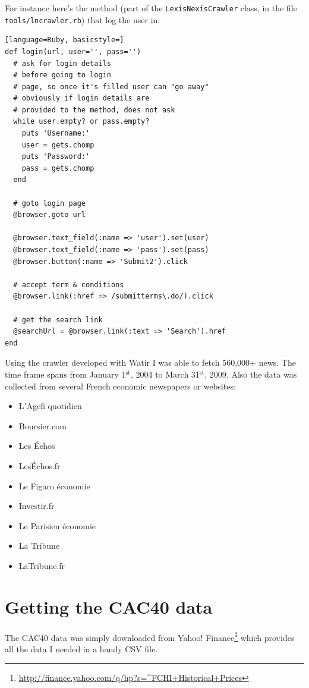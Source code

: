 \documentclass[12pt]{report}
\newcommand{\superscript}[1]{\ensuremath{^{\textrm{#1}}}}
\newcommand{\st}[0]{\superscript{st}}
\begin{document}
			For instance here's the method (part of the \lstinline!LexisNexisCrawler! class, in the file \lstinline!tools/lncrawler.rb!) that log the user in:
			
			\begin{lstlisting}[language=Ruby, basicstyle=]
def login(url, user='', pass='')
  # ask for login details
  # before going to login
  # page, so once it's filled user can "go away"
  # obviously if login details are 
  # provided to the method, does not ask
  while user.empty? or pass.empty?
    puts 'Username:'
    user = gets.chomp
    puts 'Password:'
    pass = gets.chomp
  end

  # goto login page
  @browser.goto url

  @browser.text_field(:name => 'user').set(user)
  @browser.text_field(:name => 'pass').set(pass)
  @browser.button(:name => 'Submit2').click
                                                                                                 
  # accept term & conditions
  @browser.link(:href => /submitterms\.do/).click

  # get the search link
  @searchUrl = @browser.link(:text => 'Search').href
end
			\end{lstlisting}
			
			Using the crawler developed with Watir I was able to fetch 560,000+ news. The time frame spans from January 1\st, 2004 to March 31\st, 2009. Also the data was collected from several French economic newspapers or websites:
			\begin{itemize}
				\item L'Agefi quotidien
				\item Boursier.com
				\item Les \'Echos
				\item Les\'Echos.fr
				\item Le Figaro économie
				\item Investir.fr
				\item Le Parisien économie
				\item La Tribune
				\item LaTribune.fr
			\end{itemize}
			
		\section{Getting the CAC40 data}
		
			The CAC40 data was simply downloaded from Yahoo! Finance\footnote{\url{http://finance.yahoo.com/q/hp?s=^FCHI+Historical+Prices}} which provides all the data I needed in a handy  CSV file.
		
\end{document}
